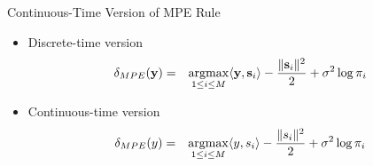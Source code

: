 \documentclass[t]{beamer}
\newcommand{\argmax}{\operatornamewithlimits{argmax}}
\begin{document}
\begin{frame}{Continuous-Time Version of MPE Rule}
  \footnotesize
  \begin{itemize}
    \item Discrete-time version
      \begin{eqnarray*}
        \delta_{MPE}(\mathbf{y}) & = & \argmax_{1 \leq i \leq M} \langle \mathbf{y}, \mathbf{s}_i \rangle - \frac{\lVert \mathbf{s}_i \rVert^2}{2} +\sigma^2\log \pi_i
      \end{eqnarray*}
    \pause
    \item Continuous-time version
      \begin{eqnarray*}
        \delta_{MPE}(y) & = & \argmax_{1 \leq i \leq M} \langle y, s_i \rangle - \frac{\lVert s_i \rVert^2}{2} +\sigma^2\log \pi_i
      \end{eqnarray*}
  \end{itemize}
  \normalsize
\end{frame}
\end{document}
